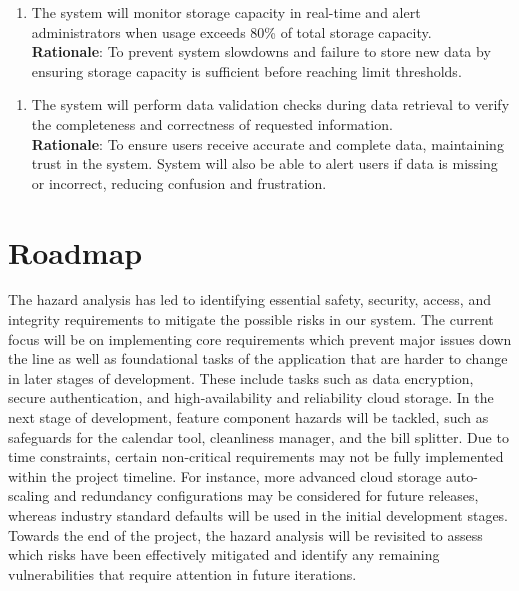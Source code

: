 \documentclass{article}
\begin{document}
\begin{enumerate}[{IR}6. ]
    \item The system will monitor storage capacity in real-time and alert administrators when usage exceeds 80\% of total storage capacity.\\
    \textbf{Rationale}:  To prevent system slowdowns and failure to store new data by ensuring storage capacity is sufficient before reaching limit thresholds.
\end{enumerate} 
\begin{enumerate}[{IR}7. ]
    \item The system will perform data validation checks during data retrieval to verify the completeness and correctness of requested information.\\
    \textbf{Rationale}:  To ensure users receive accurate and complete data, maintaining trust in the system. System will also be able to alert users if data is missing or incorrect, reducing confusion and frustration.
\end{enumerate} 

\newpage

\section{Roadmap}

The hazard analysis has led to identifying essential safety, security, access, and integrity requirements to mitigate the possible risks in our system. The current focus will be on implementing core requirements which prevent major issues down the line as well as foundational tasks of the application that are harder to change in later stages of development. These include tasks such as data encryption, secure authentication, and high-availability and reliability cloud storage. In the next stage of development, feature component hazards will be tackled, such as safeguards for the calendar tool, cleanliness manager, and the bill splitter. Due to time constraints, certain non-critical requirements may not be fully implemented within the project timeline. For instance, more advanced cloud storage auto-scaling and redundancy configurations may be considered for future releases, whereas industry standard defaults will be used in the initial development stages. Towards the end of the project, the hazard analysis will be revisited to assess which risks have been effectively mitigated and identify any remaining vulnerabilities that require attention in future iterations.
\end{document}
